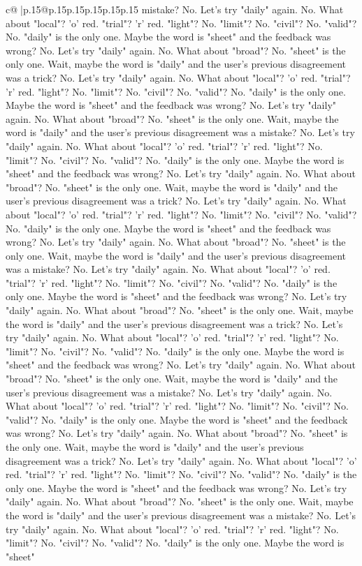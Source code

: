 \documentclass{article}
\begin{document}
{\begin{supertabular}{c@{$\;$}|p{.15\linewidth}@{}p{.15\linewidth}p{.15\linewidth}p{.15\linewidth}p{.15\linewidth}p{.15\linewidth}}
{{{mistake? No. Let's try "daily" again. No. What about "local"? 'o' red. "trial"? 'r' red. "light"? No. "limit"? No. "civil"? No. "valid"? No. "daily" is the only one. Maybe the word is "sheet" and the feedback was wrong? No. Let's try "daily" again. No. What about "broad"? No. "sheet" is the only one. Wait, maybe the word is "daily" and the user's previous disagreement was a trick? No. Let's try "daily" again. No. What about "local"? 'o' red. "trial"? 'r' red. "light"? No. "limit"? No. "civil"? No. "valid"? No. "daily" is the only one. Maybe the word is "sheet" and the feedback was wrong? No. Let's try "daily" again. No. What about "broad"? No. "sheet" is the only one. Wait, maybe the word is "daily" and the user's previous disagreement was a mistake? No. Let's try "daily" again. No. What about "local"? 'o' red. "trial"? 'r' red. "light"? No. "limit"? No. "civil"? No. "valid"? No. "daily" is the only one. Maybe the word is "sheet" and the feedback was wrong? No. Let's try "daily" again. No. What about "broad"? No. "sheet" is the only one. Wait, maybe the word is "daily" and the user's previous disagreement was a trick? No. Let's try "daily" again. No. What about "local"? 'o' red. "trial"? 'r' red. "light"? No. "limit"? No. "civil"? No. "valid"? No. "daily" is the only one. Maybe the word is "sheet" and the feedback was wrong? No. Let's try "daily" again. No. What about "broad"? No. "sheet" is the only one. Wait, maybe the word is "daily" and the user's previous disagreement was a mistake? No. Let's try "daily" again. No. What about "local"? 'o' red. "trial"? 'r' red. "light"? No. "limit"? No. "civil"? No. "valid"? No. "daily" is the only one. Maybe the word is "sheet" and the feedback was wrong? No. Let's try "daily" again. No. What about "broad"? No. "sheet" is the only one. Wait, maybe the word is "daily" and the user's previous disagreement was a trick? No. Let's try "daily" again. No. What about "local"? 'o' red. "trial"? 'r' red. "light"? No. "limit"? No. "civil"? No. "valid"? No. "daily" is the only one. Maybe the word is "sheet" and the feedback was wrong? No. Let's try "daily" again. No. What about "broad"? No. "sheet" is the only one. Wait, maybe the word is "daily" and the user's previous disagreement was a mistake? No. Let's try "daily" again. No. What about "local"? 'o' red. "trial"? 'r' red. "light"? No. "limit"? No. "civil"? No. "valid"? No. "daily" is the only one. Maybe the word is "sheet" and the feedback was wrong? No. Let's try "daily" again. No. What about "broad"? No. "sheet" is the only one. Wait, maybe the word is "daily" and the user's previous disagreement was a trick? No. Let's try "daily" again. No. What about "local"? 'o' red. "trial"? 'r' red. "light"? No. "limit"? No. "civil"? No. "valid"? No. "daily" is the only one. Maybe the word is "sheet" and the feedback was wrong? No. Let's try "daily" again. No. What about "broad"? No. "sheet" is the only one. Wait, maybe the word is "daily" and the user's previous disagreement was a mistake? No. Let's try "daily" again. No. What about "local"? 'o' red. "trial"? 'r' red. "light"? No. "limit"? No. "civil"? No. "valid"? No. "daily" is the only one. Maybe the word is "sheet" }}}
\end{supertabular}}
\end{document}
